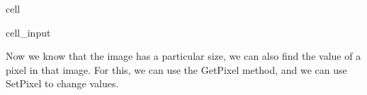 \documentclass[letterpaper,10pt,english]{jupyterBook}
\begin{document}
\begin{sphinxuseclass}{cell}\begin{sphinxVerbatimInput}

\begin{sphinxuseclass}{cell_input}
\begin{sphinxVerbatim}[commandchars=\\\{\}]
\end{sphinxVerbatim}

\end{sphinxuseclass}\end{sphinxVerbatimInput}

\end{sphinxuseclass}
\sphinxAtStartPar
Now we know that the image has a particular size, we can also find the value of a pixel in that image. For this, we can use the GetPixel method, and we can use SetPixel to change values.
\end{document}
